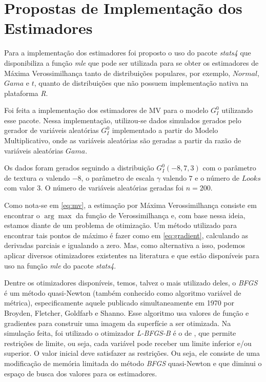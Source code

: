 \documentclass[12pt]{article}
\begin{document}
\section{Propostas de Implementação dos Estimadores}

Para a implementação dos estimadores foi proposto o uso do pacote \emph{stats4} que disponibiliza a função \emph{mle} que pode ser utilizada para se obter os estimadores de Máxima Verossimilhança tanto de distribuições populares, por exemplo, $Normal$, $Gama$ e $t$, quanto de distribuições que não possuem implementação nativa na plataforma \textit{R}.

Foi feita a implementação dos estimadores de MV para o modelo $G_I^0$ utilizando esse pacote. Nessa implementação, utilizou-se dados simulados gerados pelo gerador de variáveis aleatórias $G_I^0$ implementado a partir do Modelo Multiplicativo, onde as variáveis aleatórias são geradas a partir da razão de variáveis aleatórias $Gama$.

Os dados foram gerados seguindo a distribuição $G_I^0(-8, 7, 3)$ com o parâmetro de textura $\alpha$ valendo $-8$, o parâmetro de escala $\gamma$ valendo $7$ e o número de $Looks$ com valor 3. O número de variáveis aleatórias geradas foi $n = 200$.

Como nota-se em \eqref{eq:mv}, a estimação por Máxima Verossimilhança consiste em encontrar o $\arg\max$ da função de Verossimilhança e, com base nessa ideia, estamos diante de um problema de otimização. Um método utilizado para encontrar tais pontos de máximo é fazer como em \eqref{eq:gradient}, calculando as derivadas parciais e igualando a zero. Mas, como alternativa a isso, podemos aplicar diversos otimizadores existentes na literatura e que estão disponíveis para uso na função \textit{mle} do pacote \textit{stats4}.

Dentre os otimizadores disponíveis, temos, talvez o mais utilizado deles, o \emph{BFGS} é um método quasi-Newton (também conhecido como algoritmo variável de métrica), especificamente aquele publicado simultaneamente em 1970 por Broyden, Fletcher, Goldfarb e Shanno. Esse algoritmo usa valores de função e gradientes para construir uma imagem da superfície a ser otimizada. Na simulação feita, foi utilizado o otimizador \emph{L-BFGS-B} é o de \citet{Byrd_1995}, que permite restrições de limite, ou seja, cada variável pode receber um limite inferior e/ou superior. O valor inicial deve satisfazer as restrições. Ou seja, ele consiste de uma modificação de memória limitada do método \emph{BFGS} quasi-Newton e que diminui o espaço de busca dos valores para os estimadores.
\end{document}
